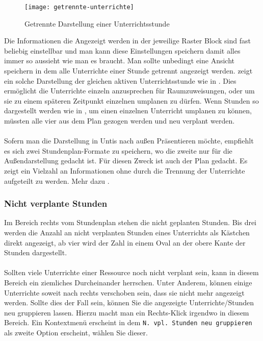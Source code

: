\begin{wrapfigure}{r}{0.3\textwidth}
	\centering
	\texttt{[image: getrennte-unterrichte]}
	\vspace{-5pt}
	\caption{Getrennte Darstellung einer Unterrichtsstunde}
	\label{fig:getrennte-unterrichte}
\end{wrapfigure}

\noindent
Die Informationen die Angezeigt werden in der jeweilige Raster Block sind fast beliebig einstellbar und man kann diese Einstellungen speichern damit alles immer so aussieht wie man es braucht. Man sollte unbedingt eine Ansicht speichern in dem alle Unterrichte einer Stunde getrennt angezeigt werden.  zeigt ein solche Darstellung der gleichen aktiven Unterrichtsstunde wie in . Dies ermöglicht die Unterrichte einzeln anzusprechen für Raumzuweisungen, oder um sie zu einem späteren Zeitpunkt einzelnen umplanen zu dürfen. Wenn Stunden so dargestellt werden wie in , um einen einzelnen Unterricht umplanen zu können, müssten alle vier aus dem Plan gezogen werden und neu verplant werden.\\
\\
Sofern man die Darstellung in Untis nach außen Präsentieren möchte, empfiehlt es sich zwei Stundenplan-Formate zu speichern, wo die zweite nur für die Außendarstellung gedacht ist. Für diesen Zweck ist auch der Plan  gedacht. Es zeigt ein Vielzahl an Informationen ohne durch die Trennung der Unterrichte aufgeteilt zu werden. Mehr dazu .

\subsubsection{Nicht verplante Stunden}

Im Bereich rechts vom Stundenplan stehen die nicht geplanten Stunden. Bis drei werden die Anzahl an nicht verplanten Stunden eines Unterrichts als Kästchen direkt angezeigt, ab vier wird der Zahl in einem Oval an der obere Kante der Stunden dargestellt.\\
\\
Sollten viele Unterrichte einer Ressource noch nicht verplant sein, kann in diesem Bereich ein ziemliches Durcheinander herrschen. Unter Anderem, können einige Unterrichte soweit nach rechts verschoben sein, dass sie nicht mehr angezeigt werden. Sollte dies der Fall sein, können Sie die angezeigte Unterrichte/Stunden neu gruppieren lassen. Hierzu macht man ein Rechts-Klick irgendwo in diesem Bereich. Ein Kontextmenü erscheint in dem \texttt{N. vpl. Stunden neu gruppieren} als zweite Option erscheint, wählen Sie dieser.

